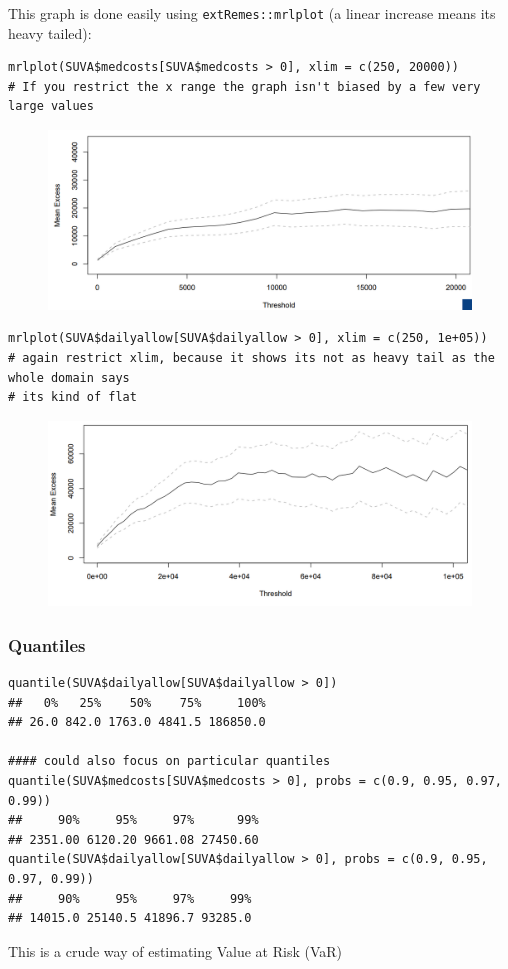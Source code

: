 \documentclass[11pt]{article}
\newcommand{\noi}{\noindent}
\begin{document}
\noi This graph is done easily using \texttt{extRemes::mrlplot} (a linear increase means its heavy tailed):
\begin{lstlisting}
mrlplot(SUVA$medcosts[SUVA$medcosts > 0], xlim = c(250, 20000))
# If you restrict the x range the graph isn't biased by a few very large values
\end{lstlisting}
\begin{figure}[H]
    \centering
    \includegraphics[width=0.7\linewidth]{SUVA - MRL - MedCosts.png}
\end{figure}

\begin{lstlisting}
mrlplot(SUVA$dailyallow[SUVA$dailyallow > 0], xlim = c(250, 1e+05))
# again restrict xlim, because it shows its not as heavy tail as the whole domain says
# its kind of flat
\end{lstlisting}
\begin{figure}[H]
    \centering
    \includegraphics[width=0.7\linewidth]{SUVA - MRL - Daily Allow.png}
\end{figure}

\subsubsection{Quantiles}
\begin{lstlisting}
quantile(SUVA$dailyallow[SUVA$dailyallow > 0])
##   0%   25%    50%    75%     100%
## 26.0 842.0 1763.0 4841.5 186850.0

#### could also focus on particular quantiles
quantile(SUVA$medcosts[SUVA$medcosts > 0], probs = c(0.9, 0.95, 0.97, 0.99))
##     90%     95%     97%      99%
## 2351.00 6120.20 9661.08 27450.60
quantile(SUVA$dailyallow[SUVA$dailyallow > 0], probs = c(0.9, 0.95, 0.97, 0.99))
##     90%     95%     97%     99%
## 14015.0 25140.5 41896.7 93285.0
\end{lstlisting}
\noi This is a crude way of estimating Value at Risk (VaR)
\end{document}

